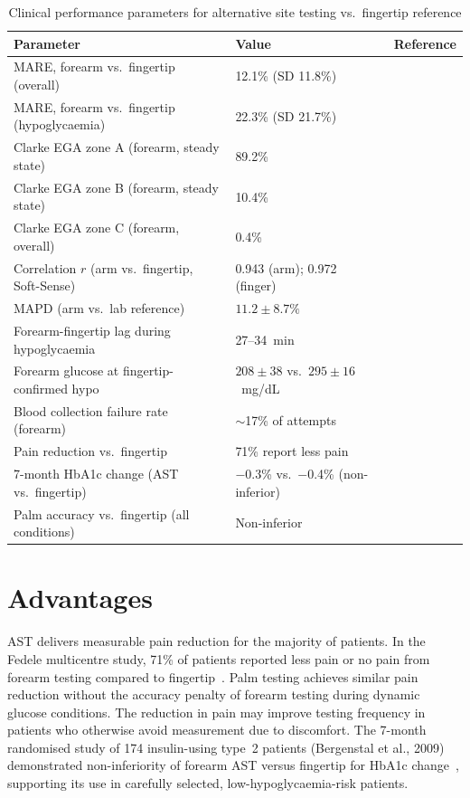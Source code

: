 \begin{table}[H]
\centering
\caption{Clinical performance parameters for alternative site testing vs.\ fingertip reference}
\label{tab:ast_stats}
\begin{tabular}{p{7.5cm}p{3.5cm}p{2.5cm}}
\toprule
\textbf{Parameter} & \textbf{Value} & \textbf{Reference} \\
\midrule
MARE, forearm vs.\ fingertip (overall) & 12.1\% (SD 11.8\%) & \cite{fedele2003} \\
MARE, forearm vs.\ fingertip (hypoglycaemia) & 22.3\% (SD 21.7\%) & \cite{fedele2003} \\
Clarke EGA zone A (forearm, steady state) & 89.2\% & \cite{fedele2003} \\
Clarke EGA zone B (forearm, steady state) & 10.4\% & \cite{fedele2003} \\
Clarke EGA zone C (forearm, overall) & 0.4\% & \cite{fedele2003} \\
Correlation $r$ (arm vs.\ fingertip, Soft-Sense) & 0.943 (arm); 0.972 (finger) & \cite{jungheim2002} \\
MAPD (arm vs.\ lab reference) & $11.2 \pm 8.7\%$ & \cite{jungheim2002} \\
Forearm-fingertip lag during hypoglycaemia & 27--34~min & \cite{jungheim2001} \\
Forearm glucose at fingertip-confirmed hypo & $208 \pm 38$ vs.\ $295 \pm 16$~mg/dL & \cite{jungheim2001} \\
Blood collection failure rate (forearm) & $\sim$17\% of attempts & \cite{fedele2003} \\
Pain reduction vs.\ fingertip & 71\% report less pain & \cite{fedele2003} \\
7-month HbA1c change (AST vs.\ fingertip) & $-$0.3\% vs.\ $-$0.4\% (non-inferior) & \cite{bergenstal2009} \\
Palm accuracy vs.\ fingertip (all conditions) & Non-inferior & \cite{bina2003} \\
\bottomrule
\end{tabular}
\end{table}

\section{Advantages}

AST delivers measurable pain reduction for the majority of patients. In the Fedele multicentre study, 71\% of patients reported less pain or no pain from forearm testing compared to fingertip~\cite{fedele2003}. Palm testing achieves similar pain reduction without the accuracy penalty of forearm testing during dynamic glucose conditions. The reduction in pain may improve testing frequency in patients who otherwise avoid measurement due to discomfort. The 7-month randomised study of 174 insulin-using type~2 patients (Bergenstal et al., 2009) demonstrated non-inferiority of forearm AST versus fingertip for HbA1c change~\cite{bergenstal2009}, supporting its use in carefully selected, low-hypoglycaemia-risk patients.

